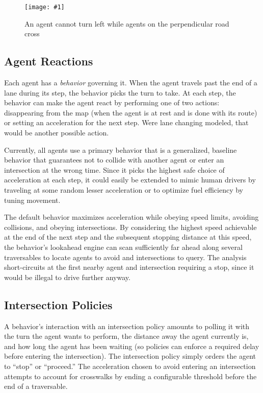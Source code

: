 \documentclass[letterpaper, 10 pt, conference]{ieeeconf}  %
\newcommand{\pix}[3]{
  \begin{figure}[h]
    \centering \texttt{[image: \#1]}
    \caption{#2}
  \end{figure}
}
\begin{document}
\pix{turn_conflicts.png}
    {An agent cannot turn left while agents on the perpendicular road cross}
    {scale=0.5}

\subsection{Agent Reactions}

Each agent has a \emph{behavior} governing it. When the agent travels past the end
of a lane during its step, the behavior picks the turn to take. At each step,
the behavior can make the agent react by performing one of two actions:
disappearing from the map (when the agent is at rest and is done with its route)
or setting an acceleration for the next step. Were lane changing modeled, that
would be another possible action.

Currently, all agents use a primary behavior that is a generalized, baseline
behavior that guarantees not to collide with another agent or enter an
intersection at the wrong time. Since it picks the highest safe choice of
acceleration at each step, it could easily be extended to mimic human drivers by
traveling at some random lesser acceleration or to optimize fuel efficiency
by tuning movement.


The default behavior maximizes acceleration while obeying speed limits,
avoiding collisions, and obeying intersections. By considering the highest speed
achievable at the end of the next step and the subsequent stopping distance at
this speed, the behavior's lookahead engine can scan sufficiently far ahead
along several traversables to locate agents to avoid and intersections to query.
The analysis short-circuits at the first nearby agent and intersection requiring
a stop, since it would be illegal to drive further anyway.

\subsection{Intersection Policies}

A behavior's interaction with an intersection policy amounts to polling it with
the turn the agent wants to perform, the distance away the agent currently is,
and how long the agent has been waiting (so policies can enforce a required
delay before entering the intersection). The intersection policy simply orders
the agent to ``stop'' or ``proceed.'' The acceleration chosen to avoid entering
an intersection attempts to account for crosswalks by ending a configurable
threshold before the end of a traversable.
\end{document}

